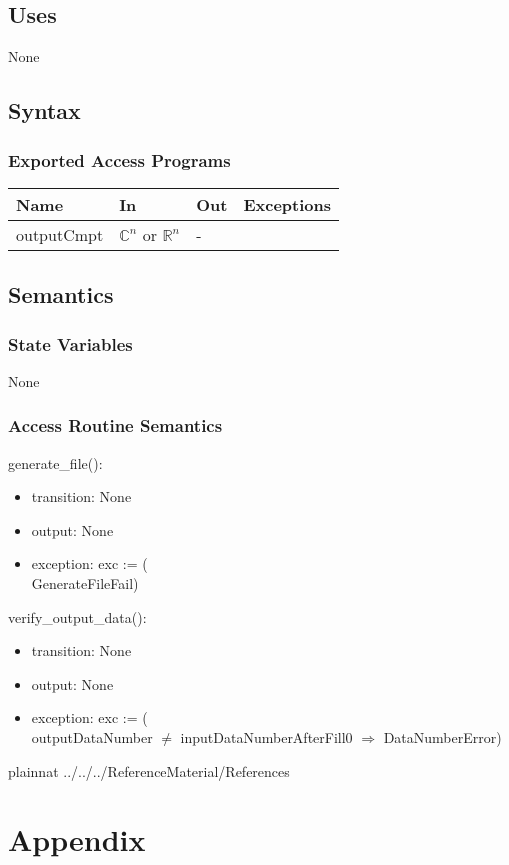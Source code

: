 \documentclass[12pt, titlepage]{article}
\begin{document}
\subsection{Uses}
None
\subsection{Syntax}

\subsubsection{Exported Access Programs}

\begin{center}
\begin{tabular}{p{2cm} p{4cm} p{4cm} p{2cm}}
\hline
\textbf{Name} & \textbf{In} & \textbf{Out} & \textbf{Exceptions} \\
\hline
outputCmpt & $\mathbb{C}^ n$ or $\mathbb{R}^ n$& - & \\

\hline
\end{tabular}
\end{center}

\subsection{Semantics}

\subsubsection{State Variables}
None

\subsubsection{Access Routine Semantics}

generate\_file():

\begin{itemize}
\item transition: None
\item output:  None
\item exception: exc := (\\
GenerateFileFail)
\end{itemize}
verify\_output\_data():
\begin{itemize}
\item transition: None
\item output:  None
\item exception: exc := (\\
outputDataNumber $\neq$ inputDataNumberAfterFill0 $\Rightarrow$ DataNumberError)
\end{itemize}


\newpage

 {plainnat}
 {../../../ReferenceMaterial/References}

\newpage

\section{Appendix} \label{Appendix}

\end{document}

